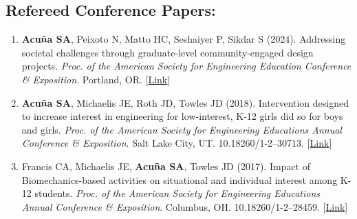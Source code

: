 \documentclass[letterpaper, 10pt]{article}
\begin{document}
\subsection{Refereed Conference Papers:}
\begin{enumerate}
     \item \textbf{Acuña SA}, Peixoto N, Matto HC, Seshaiyer P, Sikdar S (2024). Addressing societal challenges through graduate-level community-engaged design projects. \textit{Proc. of the American Society for Engineering Education Conference \& Exposition}. Portland, OR.  [\href{https://peer.asee.org/46521}{Link}] %
     \item \textbf{Acuña SA}, Michaelis JE, Roth JD, Towles JD (2018). Intervention designed to increase interest in engineering for low-interest, K-12 girls did so for boys and girls. \textit{Proc. of the American Society for Engineering Educations Annual Conference \& Exposition}. Salt Lake City, UT. 10.18260/1-2--30713. [\href{https://peer.asee.org/intervention-designed-to-increase-interest-in-engineering-for-low-interest-k-12-girls-did-so-for-boys-and-girls}{Link}] %
     \item Francis CA, Michaelis JE, \textbf{Acuña SA}, Towles JD (2017). Impact of Biomechanics-based activities on situational and individual interest among K-12 students. \textit{Proc. of the American Society for Engineering Educations Annual Conference \& Exposition}. Columbus, OH. 10.18260/1-2--28459. [\href{https://peer.asee.org/impact-of-biomechanics-based-activities-on-situational-and-individual-interest-among-k-12-students}{Link}] %
\end{enumerate}
\end{document}
